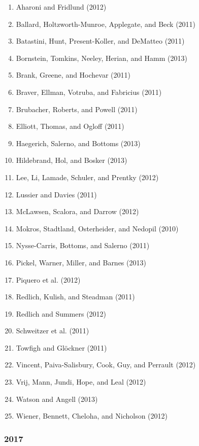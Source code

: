 \documentclass[english,man]{apa6}
\providecommand{\tightlist}{%
  \setlength{\itemsep}{0pt}\setlength{\parskip}{0pt}}
\begin{document}
\begin{enumerate}
\def\labelenumi{\arabic{enumi})}
\tightlist
\item
  Aharoni and Fridlund (2012)
\item
  Ballard, Holtzworth-Munroe, Applegate, and Beck (2011)
\item
  Batastini, Hunt, Present-Koller, and DeMatteo (2011)
\item
  Bornstein, Tomkins, Neeley, Herian, and Hamm (2013)
\item
  Brank, Greene, and Hochevar (2011)
\item
  Braver, Ellman, Votruba, and Fabricius (2011)
\item
  Brubacher, Roberts, and Powell (2011)
\item
  Elliott, Thomas, and Ogloff (2011)
\item
  Haegerich, Salerno, and Bottoms (2013)
\item
  Hildebrand, Hol, and Bosker (2013)
\item
  Lee, Li, Lamade, Schuler, and Prentky (2012)
\item
  Lussier and Davies (2011)
\item
  McLawsen, Scalora, and Darrow (2012)
\item
  Mokros, Stadtland, Osterheider, and Nedopil (2010)
\item
  Nysse-Carris, Bottoms, and Salerno (2011)
\item
  Pickel, Warner, Miller, and Barnes (2013)
\item
  Piquero et al. (2012)
\item
  Redlich, Kulish, and Steadman (2011)
\item
  Redlich and Summers (2012)
\item
  Schweitzer et al. (2011)
\item
  Towfigh and Glöckner (2011)
\item
  Vincent, Paiva-Salisbury, Cook, Guy, and Perrault (2012)
\item
  Vrij, Mann, Jundi, Hope, and Leal (2012)
\item
  Watson and Angell (2013)
\item
  Wiener, Bennett, Cheloha, and Nicholson (2012)
\end{enumerate}

\subsubsection{2017}\label{section-27}
\end{document}

